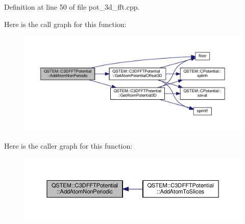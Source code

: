 Definition at line 50 of file pot\-\_\-3d\-\_\-fft.\-cpp.



Here is the call graph for this function\-:
\nopagebreak
\begin{figure}[H]
\begin{center}
\leavevmode
\includegraphics[width=350pt]{class_q_s_t_e_m_1_1_c3_d_f_f_t_potential_aac2d934bd221256296571d09eaa0fc8a_cgraph}
\end{center}
\end{figure}




Here is the caller graph for this function\-:
\nopagebreak
\begin{figure}[H]
\begin{center}
\leavevmode
\includegraphics[width=350pt]{class_q_s_t_e_m_1_1_c3_d_f_f_t_potential_aac2d934bd221256296571d09eaa0fc8a_icgraph}
\end{center}
\end{figure}


